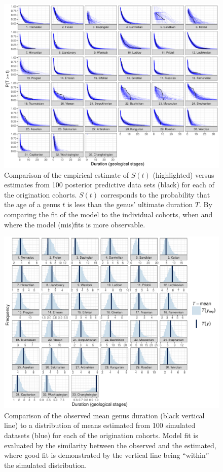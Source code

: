 \documentclass[11pt]{article}
\begin{document}
\begin{figure}[ht]
  \centering
  \includegraphics[height = 0.5\textheight,width=\textwidth,keepaspectratio=true]{figure/ppc_surv_coh}
  \caption{Comparison of the empirical estimate of \(S(t)\) (highlighted) versus estimates from 100 posterior predictive data sets (black) for each of the origination cohorts. \(S(t)\) corresponds to the probability that the age of a genus \(t\) is less than the genus' ultimate duration \(T\). By comparing the fit of the model to the individual cohorts, when and where the model (mis)fits is more observable. }
  \label{fig:surv_group}
\end{figure}

\begin{figure}[ht]
  \centering
  \includegraphics[height = 0.5\textheight,width=\textwidth,keepaspectratio=true]{figure/ppc_mean_group_cweib_cens}
  \caption{ Comparison of the observed mean genus duration (black vertical line) to a distribution of means estimated from 100 simulated datasets (blue) for each of the origination cohorts. Model fit is evaluated by the similarity between the observed and the estimated, where good fit is demonstrated by the vertical line being ``within'' the simulated distribution. }
  \label{fig:group_mean}
\end{figure}
\end{document}
